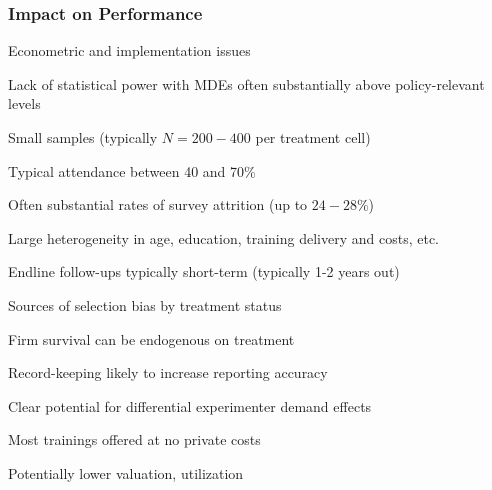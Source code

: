 \documentclass[hideothersubsections, usenames,dvipsnames,11pt]{beamer}
\newenvironment{itemize_2pt}{\itemize\addtolength{\itemsep}{2pt}}{\enditemize}
\begin{document}
\begin{frame}
\frametitle{Impact on Performance}

Econometric and implementation issues \citep{McKenzie2014}
	\begin{itemize_2pt}
		\item \textcolor{bdf}{Lack of statistical power} with MDEs often substantially above policy-relevant levels
		\begin{itemize_2pt}	
			\item Small samples (typically $N=200-400$ per treatment cell)
			\item Typical attendance between 40 and 70\%
			\item Often substantial rates of survey attrition (up to $24-28\%$)
			\item Large heterogeneity in age, education, training delivery and costs, etc.
		\end{itemize_2pt}
		
		\pause
		
		\item \textcolor{bdf}{Endline follow-ups typically short-term} (typically 1-2 years out)
		
		\item Sources of \textcolor{bdf}{selection bias} by treatment status
		\begin{itemize_2pt}	
			\item Firm survival can be endogenous on treatment
			\item Record-keeping likely to increase reporting accuracy
			\item Clear potential for differential experimenter demand effects
		\end{itemize_2pt}
		
		\item Most trainings offered at \textcolor{bdf}{no private costs}
		\begin{itemize_2pt}
			\item Potentially lower valuation, utilization \citep[see,][]{Maffioli2020}
		\end{itemize_2pt}
		
	
	\end{itemize_2pt}
\end{frame}
\end{document}
